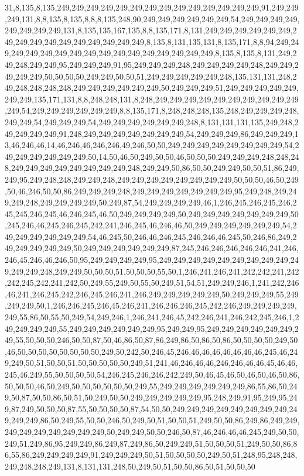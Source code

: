 31,8,135,8,135,249,249,249,249,249,249,249,249,249,249,249,249,249,249,91,249,249,249,131,8,8,135,8,135,8,8,8,135,248,90,249,249,249,249,249,249,54,249,249,249,249,249,249,249,249,131,8,135,135,167,135,8,8,135,171,8,131,249,249,249,249,249,249,249,249,249,249,249,249,249,249,249,249,8,135,8,131,135,131,8,135,171,8,8,94,249,249,249,249,249,249,249,249,249,249,249,249,249,249,249,249,8,135,8,135,8,131,249,249,248,249,249,95,249,249,249,91,95,249,249,249,248,249,249,249,249,248,249,249,249,249,249,50,50,50,50,249,249,50,50,51,249,249,249,249,249,248,135,131,131,248,249,248,248,248,248,249,249,249,249,249,249,50,249,249,249,51,249,249,249,249,249,249,249,135,171,131,8,8,248,248,131,8,248,249,249,249,249,249,249,249,249,249,249,249,54,249,249,249,249,249,249,8,8,135,171,8,248,248,248,135,248,249,249,249,248,249,249,54,249,249,249,54,249,249,249,249,249,249,248,8,131,131,131,135,249,248,249,249,249,249,91,248,249,249,249,249,249,249,249,54,249,249,249,86,249,249,249,13,46,246,46,14,46,246,46,246,246,49,246,50,50,249,249,249,249,249,249,249,249,54,249,249,249,249,249,249,50,14,50,46,50,249,50,50,46,50,50,50,249,249,249,248,248,248,249,249,249,249,249,249,249,249,248,249,249,50,86,50,50,249,249,50,50,51,86,249,249,95,249,248,248,249,249,248,249,249,249,249,249,249,249,249,50,50,50,46,50,249,50,46,246,50,50,86,249,249,249,248,249,249,249,249,249,249,249,95,249,248,249,249,249,248,249,249,249,249,50,249,87,54,249,249,249,249,46,1,246,245,246,245,246,245,245,246,245,46,246,245,46,50,249,249,249,249,50,249,249,249,249,249,249,249,50,245,246,46,245,246,245,242,241,246,245,46,246,46,50,249,249,249,249,249,249,54,249,249,249,249,249,249,54,46,245,50,246,46,246,245,246,246,46,245,50,246,86,249,249,249,249,249,249,50,249,249,249,249,249,249,87,245,246,246,246,246,246,241,246,246,45,246,46,246,50,95,249,249,249,249,95,249,249,249,249,249,249,249,249,249,249,249,249,248,249,249,50,50,50,51,50,50,50,55,50,1,246,241,246,241,242,242,241,242,242,245,242,241,242,50,249,55,249,50,55,50,249,51,54,51,249,249,246,1,241,242,246,46,241,246,245,242,246,245,246,241,246,249,249,249,249,249,50,249,249,249,55,249,249,249,50,1,246,246,245,246,45,246,241,246,246,246,245,242,246,249,249,249,249,249,55,86,50,55,50,249,54,249,246,1,246,241,246,45,242,246,241,246,242,245,246,1,249,249,249,249,55,249,249,249,249,249,249,95,249,249,95,249,249,249,249,249,249,249,55,50,50,50,246,50,50,87,50,46,86,50,87,86,249,86,50,86,50,86,50,50,50,50,249,50,46,50,50,50,50,50,50,50,50,249,50,242,50,246,45,246,46,46,46,46,46,46,46,245,46,249,249,50,51,50,50,51,50,50,50,50,50,249,51,241,46,246,46,46,246,246,46,46,45,46,46,245,46,249,55,50,50,50,50,54,246,245,246,246,242,249,50,46,45,46,50,46,50,46,50,86,50,50,50,46,50,249,50,50,50,50,50,50,249,55,249,249,249,249,249,249,86,55,86,50,249,50,87,50,50,86,50,51,50,249,50,50,249,249,249,249,249,95,248,249,91,95,249,95,249,87,249,50,50,50,87,55,50,50,50,50,87,54,50,50,249,249,249,249,249,249,249,249,249,249,249,86,50,249,55,50,50,246,50,249,50,51,50,50,51,249,50,50,86,249,86,249,249,249,249,249,249,249,249,249,50,249,249,50,50,246,50,87,46,246,46,46,245,249,50,50,249,51,249,86,95,249,249,86,249,87,249,86,50,249,249,51,50,50,50,51,249,50,50,86,86,55,86,249,249,249,249,91,249,249,249,50,51,50,50,50,50,249,50,51,248,95,248,248,249,248,248,249,131,8,131,131,248,50,249,50,51,50,50,86,50,51,50,50,50